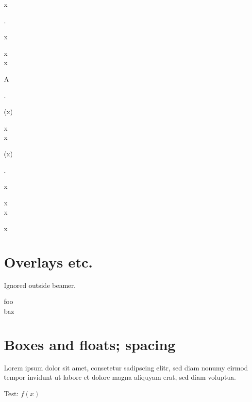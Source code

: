 \documentclass{article}
\begin{document}
{\begin{minipage}[t]{2em}
x
\end{minipage}%
%
%
%
\begin{minipage}[t]{2em}
.

x

\begin{pseudo*}[hl]
x \\
x
\end{pseudo*}%

A
\end{minipage}%
%
%
%
\begin{minipage}[t]{2em}
.

(x)

\begin{pseudo*}[hl]
x \\
x
\end{pseudo*}%

(x)
\end{minipage}%
%
%
%
\begin{minipage}[t]{2em}
.

\strut x

\begin{pseudo*}[hl]
x \\
x
\end{pseudo*}%

\strut x
\end{minipage}%
}

\section*{Overlays etc.}

Ignored outside \textsf{beamer}.

\begin{pseudo}[pause, kwfont<3>=\nf, unknown<3>=42]
    foo \\<2>
    baz
\end{pseudo}

\clearpage

\section*{Boxes and floats; spacing}

Lorem ipsum dolor sit amet, consetetur sadipscing elitr, sed diam nonumy eirmod
tempor invidunt ut labore et dolore magna aliquyam erat, sed diam voluptua.

\begin{tcolorbox}
    Test: $f(x)$
\end{tcolorbox}
\end{document}
